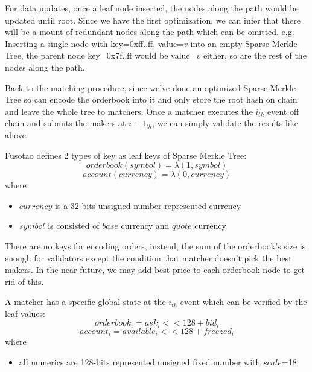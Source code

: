 \documentclass[a4paper,12pt]{article}
\begin{document}
For data updates, once a leaf node inserted, the nodes along the path would be updated until root. Since we have the first optimization, we can infer that there will be a mount of redundant nodes along the path which can be omitted. e.g. Inserting a single node with key=0xff..ff, value=\(v\) into an empty Sparse Merkle Tree, the parent node key=0x7f..ff would be value=\(v\) either, so are the rest of the nodes along the path.

Back to the matching procedure, since we've done an optimized Sparse Merkle Tree so can encode the orderbook into it and only store the root hash on chain and leave the whole tree to matchers. Once a matcher executes the \(i_{th}\) event off chain and submits the makers at \(i-1_{th}\), we can simply validate the results like above.

Fusotao defines 2 types of key as leaf keys of Sparse Merkle Tree:
\begin{equation*}
    orderbook(symbol) = \lambda(1, symbol)
\end{equation*}
\begin{equation*}
    account(currency) = \lambda(0, currency)
\end{equation*}
where
\begin{itemize}
    \item $currency$ is a 32-bits unsigned number represented currency
    \item $symbol$ is consisted of $base$ currency and $quote$ currency
\end{itemize}

There are no keys for encoding orders, instead, the sum of the orderbook's size is enough for validators except the condition that matcher doesn't pick the best makers. In the near future, we may add best price to each orderbook node to get rid of this.

A matcher has a specific global state at the \(i_{th}\) event which can be verified by the leaf values:
\begin{equation*}
    orderbook_{i} = ask_{i} << 128 + bid_{i}
\end{equation*}
\begin{equation*}
    account_{i} = available_{i} << 128 + freezed_{i}
\end{equation*}
where
\begin{itemize}
    \item all numerics are 128-bits represented unsigned fixed number with $scale$=18
\end{itemize}
\end{document}
